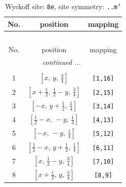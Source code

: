 \documentclass[fleqn,8pt]{jsarticle}
\begin{document}
\begin{longtable}{ccc}
\caption{Wyckoff site: {\tt 8e}, site symmetry: {\tt ..m'}}
 \\
 \hline \hline
No. & position & mapping \\ \hline \endfirsthead

\multicolumn{2}{l}{\tablename\ \thetable{}} \\
 \hline \hline
No. & position & mapping \\ \hline \endhead

 \hline \hline
\multicolumn{2}{r}{\footnotesize\it continued ...} \\ \endfoot

 \hline \hline
\multicolumn{2}{r}{} \\ \endlastfoot

1 & $\left[ x,\, y,\, \frac{3}{4} \right]$ & {\tt [1,16]} \\ \hline
2 & $\left[ x + \frac{1}{2},\, \frac{1}{2} - y,\, \frac{3}{4} \right]$ & {\tt [2,15]} \\ \hline
3 & $\left[ - x,\, y + \frac{1}{2},\, \frac{1}{4} \right]$ & {\tt [3,14]} \\ \hline
4 & $\left[ \frac{1}{2} - x,\, - y,\, \frac{1}{4} \right]$ & {\tt [4,13]} \\ \hline
5 & $\left[ - x,\, - y,\, \frac{1}{4} \right]$ & {\tt [5,12]} \\ \hline
6 & $\left[ \frac{1}{2} - x,\, y + \frac{1}{2},\, \frac{1}{4} \right]$ & {\tt [6,11]} \\ \hline
7 & $\left[ x,\, \frac{1}{2} - y,\, \frac{3}{4} \right]$ & {\tt [7,10]} \\ \hline
8 & $\left[ x + \frac{1}{2},\, y,\, \frac{3}{4} \right]$ & {\tt [8,9]} \\
\end{longtable}
\renewcommand{\arraystretch}{1.2}
\end{document}
